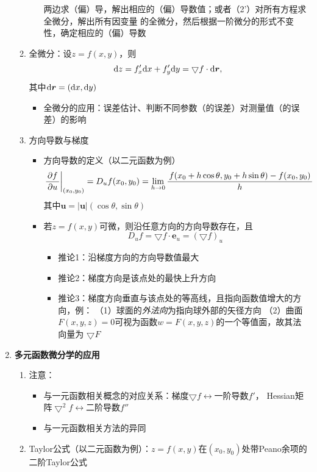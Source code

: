 \begin{enumerate}
\begin{enumerate}[(1)]
\begin{itemize}
      两边求（偏）导，解出相应的（偏）导数值；或者（2'）对所有方程求全微分，解出所有因变量
      的全微分，然后根据一阶微分的形式不变性，确定相应的（偏）导数
    \end{itemize}
    \item 全微分：设$z=f(x,y)$，则
    $$\mathrm{d} z=f'_x\mathrm{d} x+f'_y\mathrm{d} y=\bigtriangledown f\cdot \mathrm{d}\bm{r},$$
    其中$\mathrm{d}\bm{r}=(\mathrm{d} x,\mathrm{d} y)$
    \begin{itemize}
      \item 全微分的应用：误差估计、判断不同参数（的误差）对测量值（的误差）的影响
    \end{itemize}
    \item 方向导数与梯度
    \begin{itemize}
      \item 方向导数的定义（以二元函数为例）
      $$\left.\displaystyle\frac{\,{\partial f}\,}{\,{\partial u}\,}\right|_{(x_0,y_0)}=D_uf(x_0,y_0)
      =\lim\limits_{h\to0}\displaystyle\frac{\,{f(x_0+h\cos\theta,y_0+h\sin\theta)-
      f(x_0,y_0)}\,}{\,{h}\,}$$
      其中$\bm{u}=|\bm{u}|(\cos\theta,\sin\theta)$
      \item 若$z=f(x,y)$可微，则沿任意方向的方向导数存在，且
      $$D_uf=\bigtriangledown f\cdot\bm{e}_u=\left(\bigtriangledown f\right)_u$$
      \begin{itemize}
        \item 推论1：沿梯度方向的方向导数值最大
        \item 推论2：梯度方向是该点处的最快上升方向
        \item 推论3：梯度方向垂直与该点处的等高线，且指向函数值增大的方向，例：
        （1）球面的{\it 外法向}为指向球外部的矢径方向
        （2）曲面$F(x,y,z)=0$可视为函数$w=F(x,y,z)$的一个等值面，故其法向量为 
        $\bigtriangledown F$
      \end{itemize}
    \end{itemize}
  \end{enumerate}
  \item {\bf 多元函数微分学的应用}
  \begin{enumerate}[(1)]
    \item 注意：
    \begin{itemize}
      \item 与一元函数相关概念的对应关系：梯度$\bigtriangledown f\leftrightarrow$一阶导数$f'$，
      Hessian矩阵$\bigtriangledown^2f\leftrightarrow$二阶导数$f''$
      \item 与一元函数相关方法的异同 
    \end{itemize}
    \item Taylor公式（以二元函数为例）：$z=f(x,y)$在$(x_0,y_0)$处带Peano余项的二阶Taylor公式

\end{enumerate}
\end{enumerate}
